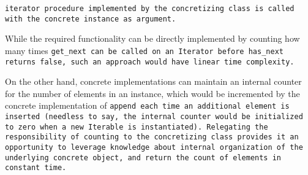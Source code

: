 
\tt{iterator} procedure implemented by the concretizing
class is called with the concrete instance as argument.

\enlargethispage*{\baselineskip}
\pagebreak

\note While the required functionality can be directly implemented by counting how
many times \tt{get_next} can be called on an \tt{Iterator} before \tt{has_next}
returns \tt{false}, such an approach would have linear time complexity.

On the other hand, concrete implementations can maintain an internal
counter for the number of elements in an instance, which would be
incremented by the concrete implementation of \tt{append} each time an
additional element is inserted (needless to say, the internal counter
would be initialized to zero when a new \tt{Iterable} is instantiated).
Relegating the responsibility of counting to the concretizing class provides
it an opportunity to leverage knowledge about internal organization of the
underlying concrete object, and return the count of elements in constant time.
